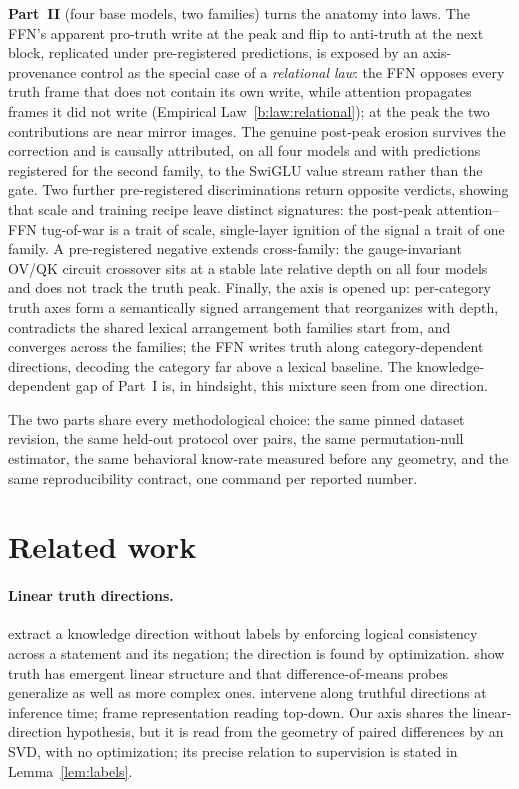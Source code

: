 \documentclass[11pt]{article}
\begin{document}
\textbf{Part~II} (four base models, two families) turns the anatomy into
laws. The FFN's apparent pro-truth write at the peak and flip to anti-truth
at the next block, replicated under pre-registered predictions, is exposed
by an axis-provenance control as the special case of a \emph{relational
law}: the FFN opposes every truth frame that does not contain its own
write, while attention propagates frames it did not write
(Empirical Law~\ref{b:law:relational}); at the peak the two contributions
are near mirror images. The genuine post-peak erosion survives the
correction and is causally attributed, on all four models and with
predictions registered for the second family, to the SwiGLU value stream
rather than the gate. Two further pre-registered discriminations return
opposite verdicts, showing that scale and training recipe leave distinct
signatures: the post-peak attention--FFN tug-of-war is a trait of scale,
single-layer ignition of the signal a trait of one family. A pre-registered
negative extends cross-family: the gauge-invariant OV/QK circuit crossover
sits at a stable late relative depth on all four models and does not track
the truth peak. Finally, the axis is opened up: per-category truth axes
form a semantically signed arrangement that reorganizes with depth,
contradicts the shared lexical arrangement both families start from, and
converges across the families; the FFN writes truth along
category-dependent directions, decoding the category far above a lexical
baseline. The knowledge-dependent gap of Part~I is, in hindsight, this
mixture seen from one direction.

The two parts share every methodological choice: the same pinned dataset
revision, the same held-out protocol over pairs, the same permutation-null
estimator, the same behavioral know-rate measured before any geometry, and
the same reproducibility contract, one command per reported number.

\section{Related work}


\paragraph{Linear truth directions.} \cite{burns2023} extract a knowledge
direction without labels by enforcing logical consistency across a statement
and its negation; the direction is found by optimization. \cite{marks2024}
show truth has emergent linear structure and that difference-of-means probes
generalize as well as more complex ones. \cite{li2023} intervene along
truthful directions at inference time; \cite{zou2023} frame representation
reading top-down. Our axis shares the linear-direction hypothesis, but it is
read from the geometry of paired differences by an SVD, with no optimization;
its precise relation to supervision is stated in Lemma~\ref{lem:labels}.
\end{document}
